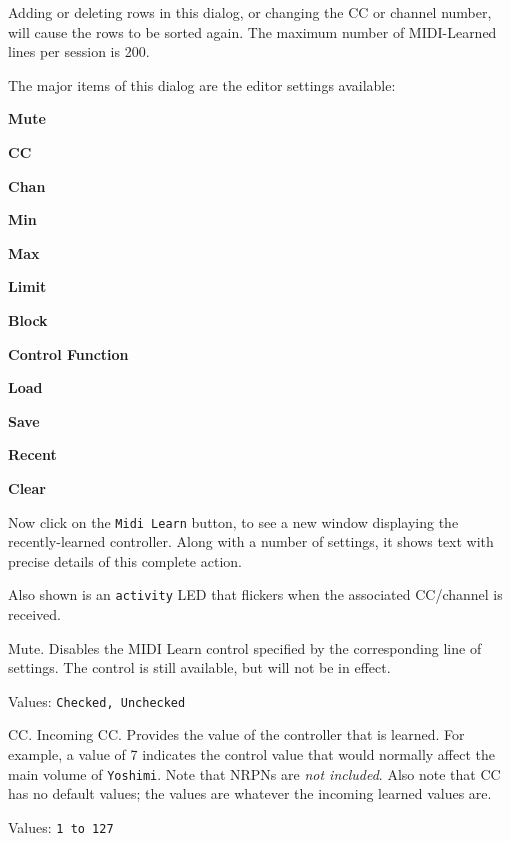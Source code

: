    Adding or deleting rows in this dialog, or changing the CC or channel
   number, will cause the rows to be sorted again.
   The maximum number of MIDI-Learned lines per session is 200.

   The major items of this dialog are the editor settings available:

   \begin{enumber}
      \item \textbf{Mute}
      \item \textbf{CC}
      \item \textbf{Chan}
      \item \textbf{Min}
      \item \textbf{Max}
      \item \textbf{Limit}
      \item \textbf{Block}
      \item \textbf{Control Function}
      \item \textbf{Load}
      \item \textbf{Save}
      \item \textbf{Recent}
      \item \textbf{Clear}
   \end{enumber}

   Now click on the \texttt{Midi Learn} button, to see a new window displaying
   the recently-learned controller. Along with a number of settings, it shows
   text with precise details of this complete action.

   Also shown is an \texttt{activity} LED that flickers when the associated
   CC/channel is received.

   \setcounter{ItemCounter}{0}      %

   Mute.
   Disables the MIDI Learn control specified by the corresponding line of
   settings.  The control is still available, but will not be in effect.

   Values: \texttt{Checked, Unchecked}

   CC.
   Incoming CC.
   Provides the value of the controller that is learned.
   For example, a value of 7 indicates the control value that would normally
   affect the main volume of \texttt{Yoshimi}.
   Note that NRPNs are \textsl{not included}.
   Also note that CC has no default values; the values are whatever the
   incoming learned values are.

   Values: \texttt{1 to 127}


